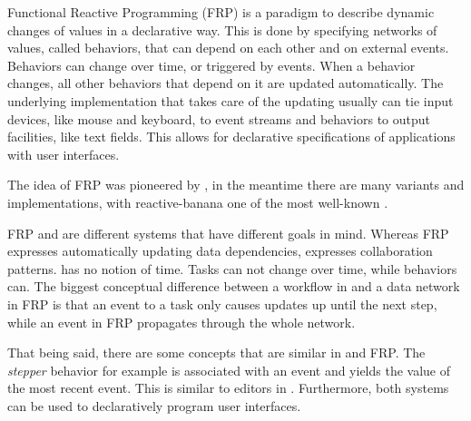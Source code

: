 Functional Reactive Programming (FRP) is a paradigm to describe dynamic changes of values in a declarative way.
This is done by specifying networks of values, called behaviors, that can depend on each other and on external events.
Behaviors can change over time, or triggered by events.
When a behavior changes, all other behaviors that depend on it are updated automatically.
The underlying implementation that takes care of the updating usually can tie input devices, like mouse and keyboard, to event streams and behaviors to output facilities, like text fields.
This allows for declarative specifications of applications with user interfaces.

The idea of FRP was pioneered by \citet{conf/icfp/ElliottH97}, in the meantime there are many variants and implementations, with reactive-banana one of the most well-known \cite{reactive-banana}.

FRP and \TOP are different systems that have different goals in mind.
Whereas FRP expresses automatically updating data dependencies, \TOP expresses collaboration patterns.
\TOP has no notion of time.
Tasks can not change over time, while behaviors can.
The biggest conceptual difference between a workflow in \TOP and a data network in FRP is that an event to a task only causes updates up until the next step, while an event in FRP propagates through the whole network.

That being said, there are some concepts that are similar in \TOP and FRP.
The \emph{stepper} behavior for example is associated with an event and yields the value of the most recent event.
This is similar to editors in \TOP.
Furthermore, both systems can be used to declaratively program user interfaces.
